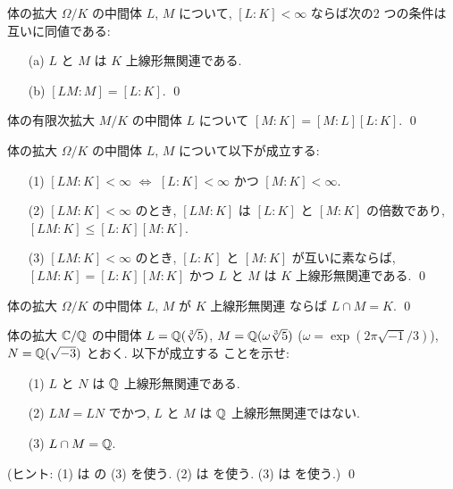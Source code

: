 \documentclass[12pt,twoside]{jarticle}
\begin{document}
\begin{question}\label{q:l-d-1}
  体の拡大 $\Omega/K$ の中間体 $L$, $M$ について, $[L:K]<\infty$ ならば次の2
  つの条件は互いに同値である:
  \begin{itemize}
  \item[(a)] $L$ と $M$ は $K$ 上線形無関連である.
  \item[(b)] $[LM:M]=[L:K]$.
    \qed
  \end{itemize}
\end{question}

\begin{question}\label{q:l-d-2}
  体の有限次拡大 $M/K$ の中間体 $L$ について $[M:K]=[M:L][L:K]$. \qed
\end{question}

\begin{question}
  体の拡大 $\Omega/K$ の中間体 $L$, $M$ について以下が成立する:
  \begin{itemize}
  \item[(1)] $[LM:K]<\infty$ $\iff$ $[L:K]<\infty$ かつ $[M:K]<\infty$.
  \item[(2)] $[LM:K]<\infty$ のとき,
    $[LM:K]$ は $[L:K]$ と $[M:K]$ の倍数であり,
    $[LM:K]\le[L:K][M:K]$.
  \item[(3)] $[LM:K]<\infty$ のとき,
    $[L:K]$ と $[M:K]$ が互いに素ならば,
    $[LM:K]=[L:K][M:K]$ かつ $L$ と $M$ は $K$ 上線形無関連である.
    \qed
  \end{itemize}
\end{question}

\begin{question}\label{q:l-d-3}
  体の拡大 $\Omega/K$ の中間体 $L$, $M$ が $K$ 上線形無関連
  ならば $L\cap M=K$. \qed
\end{question}

\begin{question}
  体の拡大 ${\mathbb C}/{\mathbb Q}$ の中間体 $L={\mathbb Q}(\sqrt[3]{5})$, $M={\mathbb Q}(\omega\sqrt[3]{5})$
  ($\omega=\exp(2\pi\sqrt{-1}/3)$), $N={\mathbb Q}(\sqrt{-3})$ とおく. 以下が成立する
  ことを示せ:
  \begin{itemize}
  \item[(1)] $L$ と $N$ は ${\mathbb Q}$ 上線形無関連である.
  \item[(2)] $LM=LN$ でかつ, $L$ と $M$ は ${\mathbb Q}$ 上線形無関連ではない.
  \item[(3)] $L\cap M={\mathbb Q}$.
  \end{itemize}
  (ヒント: (1) は  の (3) を使う.
  (2) は  を使う.
  (3) は  を使う.)
  \qed
\end{question}
\end{document}
